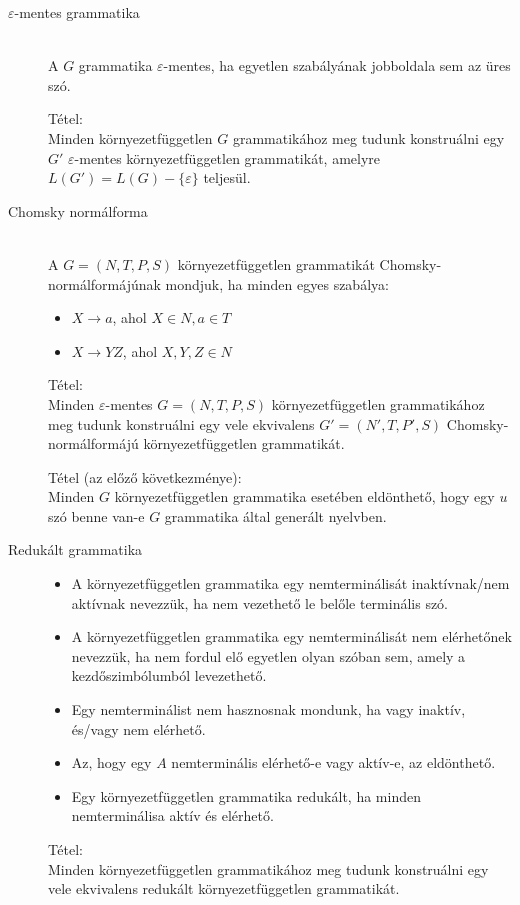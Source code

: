 \documentclass[margin=0px]{article}
\begin{document}
\begin{description}
    \item[$\varepsilon$-mentes grammatika] \hfill \\
        A $G$ grammatika $\varepsilon$-mentes, ha egyetlen szabályának jobboldala sem az üres szó.

        Tétel:\\
        Minden környezetfüggetlen $G$ grammatikához meg tudunk konstruálni egy $G'$ $\varepsilon$-mentes környezetfüggetlen grammatikát, amelyre $L(G') = L(G) - \{\varepsilon\}$ teljesül.
    \item[Chomsky normálforma] \hfill \\
        A $G = (N, T, P, S)$ környezetfüggetlen grammatikát Chomsky-normálformájúnak mondjuk, ha minden egyes szabálya:
        \begin{itemize}
            \item $X \rightarrow a$, ahol $X \in N, a \in T$
            \item $X \rightarrow YZ$, ahol $X,Y,Z \in N$
        \end{itemize}
        Tétel:\\
        Minden $\varepsilon$-mentes $G=(N,T,P,S)$ környezetfüggetlen grammatikához meg tudunk konstruálni egy vele ekvivalens $G' = (N', T, P', S)$ Chomsky-normálformájú környezetfüggetlen grammatikát.

        Tétel (az előző következménye):\\
        Minden $G$ környezetfüggetlen grammatika esetében eldönthető, hogy egy $u$ szó benne van-e $G$ grammatika által generált nyelvben.
    \item[Redukált grammatika] \hfill
        \begin{itemize}
            \item A környezetfüggetlen grammatika egy nemterminálisát inaktívnak/nem aktívnak nevezzük, ha nem vezethető le belőle terminális szó.
            \item A környezetfüggetlen grammatika egy nemterminálisát nem elérhetőnek nevezzük, ha nem fordul elő egyetlen olyan szóban sem, amely a kezdőszimbólumból levezethető.
            \item Egy nemterminálist nem hasznosnak mondunk, ha vagy inaktív, és/vagy nem elérhető.
            \item Az, hogy egy $A$ nemterminális elérhető-e vagy aktív-e, az eldönthető.
            \item Egy környezetfüggetlen grammatika redukált, ha minden nemterminálisa aktív és elérhető.
        \end{itemize}
        Tétel:\\
        Minden környezetfüggetlen grammatikához meg tudunk konstruálni egy vele ekvivalens redukált környezetfüggetlen grammatikát.

\end{description}
\end{document}
